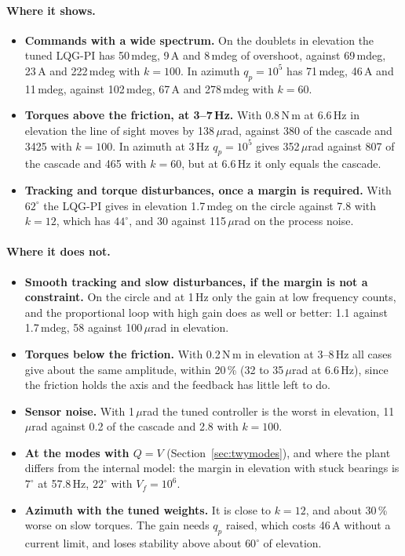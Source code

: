 \documentclass[10pt,a4paper]{article}
\numberwithin{equation}{section}
\begin{document}
\paragraph{Where it shows.}
\begin{itemize}
\item \textbf{Commands with a wide spectrum.} On the doublets in elevation the tuned LQG-PI has 50\,mdeg, 9\,A and 8\,mdeg of overshoot, against 69\,mdeg, 23\,A and 222\,mdeg with $k=100$. In azimuth $q_p=10^5$ has 71\,mdeg, 46\,A and 11\,mdeg, against 102\,mdeg, 67\,A and 278\,mdeg with $k=60$.
\item \textbf{Torques above the friction, at 3--7\,Hz.} With 0.8\,N\,m at 6.6\,Hz in elevation the line of sight moves by 138\,$\mu$rad, against 380 of the cascade and 3425 with $k=100$. In azimuth at 3\,Hz $q_p=10^5$ gives 352\,$\mu$rad against 807 of the cascade and 465 with $k=60$, but at 6.6\,Hz it only equals the cascade.
\item \textbf{Tracking and torque disturbances, once a margin is required.} With $62^\circ$ the LQG-PI gives in elevation 1.7\,mdeg on the circle against 7.8 with $k=12$, which has $44^\circ$, and 30 against 115\,$\mu$rad on the process noise.
\end{itemize}

\paragraph{Where it does not.}
\begin{itemize}
\item \textbf{Smooth tracking and slow disturbances, if the margin is not a constraint.} On the circle and at 1\,Hz only the gain at low frequency counts, and the proportional loop with high gain does as well or better: 1.1 against 1.7\,mdeg, 58 against 100\,$\mu$rad in elevation.
\item \textbf{Torques below the friction.} With 0.2\,N\,m in elevation at 3--8\,Hz all cases give about the same amplitude, within 20\,\% (32 to 35\,$\mu$rad at 6.6\,Hz), since the friction holds the axis and the feedback has little left to do.
\item \textbf{Sensor noise.} With 1\,$\mu$rad the tuned controller is the worst in elevation, 11\,$\mu$rad against 0.2 of the cascade and 2.8 with $k=100$.
\item \textbf{At the modes with $Q=V$} (Section~\ref{sec:twymodes}), and where the plant differs from the internal model: the margin in elevation with stuck bearings is $7^\circ$ at 57.8\,Hz, $22^\circ$ with $V_f=10^6$.
\item \textbf{Azimuth with the tuned weights.} It is close to $k=12$, and about 30\,\% worse on slow torques. The gain needs $q_p$ raised, which costs 46\,A without a current limit, and loses stability above about $60^\circ$ of elevation.
\end{itemize}
\end{document}
